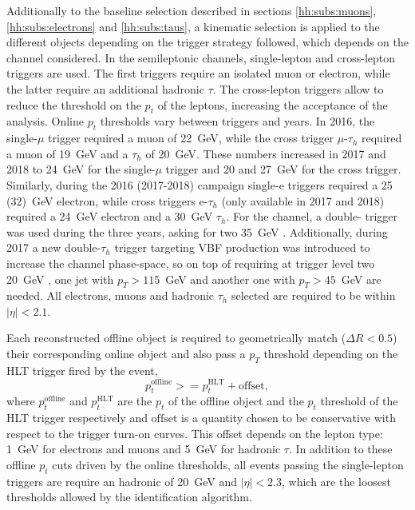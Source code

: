 \documentclass[../main.tex]{subfiles}
\begin{document}
Additionally to the baseline selection described in sections \ref{hh:subs:muons}, \ref{hh:subs:electrons} and \ref{hh:subs:taus}, a kinematic selection is applied to the different objects depending on the trigger strategy followed, which depends on the channel considered. In the semileptonic channels, single-lepton and cross-lepton triggers are used. The first triggers require an isolated muon or electron, while the latter require an additional hadronic $\tau$. The cross-lepton triggers allow to reduce the threshold on the $p_t$ of the leptons, increasing the acceptance of the analysis. Online $p_t$ thresholds vary between triggers and years. In 2016, the single-$\mu$ trigger required a muon of 22~GeV, while the cross trigger $\mu$-$\tau_h$ required a muon of 19~GeV and a $\tau_h$ of 20~GeV. These numbers increased in 2017 and 2018 to 24~GeV for the single-$\mu$ trigger and 20 and 27~GeV for the cross trigger. Similarly, during the 2016 (2017-2018) campaign single-e triggers required a 25 (32)~GeV electron, while cross triggers e-$\tau_h$ (only available in 2017 and 2018) required a 24~GeV electron and a 30~GeV $\tau_h$. For the \tauh\tauh{} channel, a double-\tauh{} trigger was used during the three years, asking for two 35~GeV \tauh{}. Additionally, during 2017 a new double-$\tau_h$ trigger targeting VBF production was introduced to increase the \tauh\tauh{} channel phase-space, so on top of requiring at trigger level two 20~GeV \tauh{}, one jet with  $p_T>115$~GeV and another one with $p_T>45$~GeV are needed. All electrons, muons and hadronic $\tau_h$ selected are required to be within $|\eta| < 2.1$.

Each reconstructed offline object is required to geometrically match ($\Delta R < 0.5$) their corresponding online object and also pass a $p_T$ threshold depending on the HLT trigger fired by the event,
\begin{equation}
p_t^{\text{offline}} >= p_t^{\text{HLT}} + \text{offset},
\end{equation}
where $p_t^{\text{offline}}$ and $p_t^{\text{HLT}}$ are the $p_t$ of the offline object and the $p_t$ threshold of the HLT trigger respectively and $\text{offset}$ is a quantity chosen to be conservative with respect to the trigger turn-on curves. This offset depends on the lepton type: 1~GeV for electrons and muons and 5~GeV for hadronic $\tau$. In addition to these offline $p_t$ cuts driven by the online thresholds, all events passing the single-lepton triggers are require an hadronic \tauh{} of 20~GeV and $|\eta| < 2.3$, which are the loosest thresholds allowed by the \tauh{} identification algorithm. 
\end{document}
